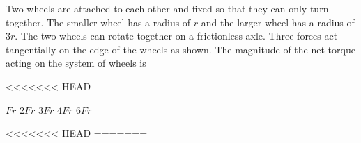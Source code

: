 \documentclass{../../oss-apphys-exam}
\begin{document}
\begin{multicols*}{2}
\begin{questions}
    \question Two wheels are attached to each other and fixed so that they can
    only turn together. The smaller wheel has a radius of $r$ and the larger
    wheel has a radius of $3r$. The two wheels can rotate together on a
    frictionless axle. Three forces act tangentially on the edge of the wheels
    as shown. The magnitude of the net torque acting on the system of wheels is
    \begin{center}
<<<<<<< HEAD
    \end{center}
    \begin{choices}
      \choice $Fr$
      \choice $2Fr$
      \choice $3Fr$
      \choice $4Fr$
      \choice $6Fr$
    \end{choices}
<<<<<<< HEAD
=======



\end{questions}
\end{multicols*}
\end{document}
